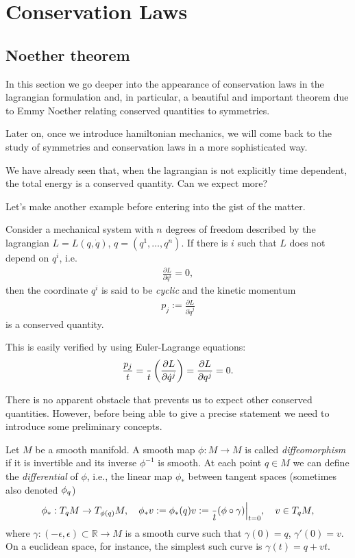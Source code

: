 \documentclass[english,fontsize=11pt,paper=a5,oneside]{scrbook}
\newcommand{\R}{\mathbb{R}}
\let\d\relax
\newcommand{\d}{\mathrm{d}}
\theoremstyle{definition}
\newenvironment{example}
  {\pushQED{\qed}\renewcommand{\qedsymbol}{$\lozenge$}\examplex}
  {\popQED\endexamplex}
\begin{document}
\chapter{Conservation Laws}

\section{Noether theorem}

In this section we go deeper into the appearance of conservation laws in the lagrangian formulation and, in particular, a beautiful and important theorem due to Emmy Noether relating conserved quantities to symmetries.

Later on, once we introduce hamiltonian mechanics, we will come back to the study of symmetries and conservation laws in a more sophisticated way.

We have already seen that, when the lagrangian is not explicitly time dependent, the total energy is a conserved quantity.
Can we expect more?

Let's make another example before entering into the gist of the matter.

\begin{example}[kinetic momentum]\label{ex:linearm}
  Consider a mechanical system with $n$ degrees of freedom described by the lagrangian $L=L(q,\dot q)$, $q=(q^1,\ldots,q^n)$.
  If there is $i$ such that $L$ does not depend on $q^i$, i.e.
  \begin{eqnarray}
    \frac{\partial L}{\partial q^i} = 0,
  \end{eqnarray}
  then the coordinate $q^i$ is said to be \emph{cyclic} and the kinetic momentum
  \begin{eqnarray}
    p_j := \frac{\partial L}{\partial\dot q^j}
  \end{eqnarray}
  is a conserved quantity.

  This is easily verified by using Euler-Lagrange equations:
  \begin{eqnarray}
    \frac{\d p_j}{\d t} =
    \frac{\d}{\d t} \left(\frac{\partial L}{\partial \dot q^j}\right)=
    \frac{\partial L}{\partial q^j} = 0.
  \end{eqnarray}
\end{example}

There is no apparent obstacle that prevents us to expect other conserved quantities. However, before being able to give a precise statement we need to introduce some preliminary concepts.

Let $M$ be a smooth manifold. A smooth map $\phi : M \to M$ is called \emph{diffeomorphism} if it is invertible and its inverse $\phi^{-1}$ is smooth. At each point $q\in M$ we can define the \emph{differential} of $\phi$, i.e., the linear map $\phi_*$ between tangent spaces (sometimes also denoted $\d\phi_q$)
\begin{equation}
  \phi_*: T_q M \to T_{\phi(q)} M,
  \quad \phi_* v := \phi_*(q) v := \frac{\d}{\d t} (\phi \circ \gamma) \Big|_{t=0},
  \quad v\in T_q M,
\end{equation}
where $\gamma:(-\epsilon, \epsilon)\subset\R \to M$ is a smooth curve such that $\gamma(0)=q$, $\gamma'(0) = v$.
On a euclidean space, for instance, the simplest such curve is $\gamma(t) = q + v t$.
\end{document}
